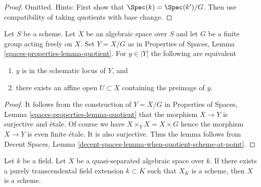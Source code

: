 \begin{proof}
Omitted. Hints: First show that $\Spec(k) = \Spec(k')/G$.
Then use compatibility of taking quotients with base change.
\end{proof}

\begin{lemma}
\label{lemma-when-quotient-scheme-at-point}
Let $S$ be a scheme. Let $X$ be an algebraic space over $S$ and
let $G$ be a finite group acting freely on $X$. Set $Y = X/G$ as
in Properties of Spaces, Lemma \ref{spaces-properties-lemma-quotient}.
For $y \in |Y|$ the following are equivalent
\begin{enumerate}
\item $y$ is in the schematic locus of $Y$, and
\item there exists an affine open $U \subset X$
containing the preimage of $y$.
\end{enumerate}
\end{lemma}

\begin{proof}
It follows from the construction of $Y = X/G$ in
Properties of Spaces, Lemma \ref{spaces-properties-lemma-quotient}
that the morphism $X \to Y$ is surjective and \'etale.
Of course we have $X \times_Y X = X \times G$ hence the morphism
$X \to Y$ is even finite \'etale. It is also surjective.
Thus the lemma follows from
Decent Spaces, Lemma \ref{decent-spaces-lemma-when-quotient-scheme-at-point}.
\end{proof}

\begin{lemma}
\label{lemma-scheme-after-purely-transcendental-base-change}
Let $k$ be a field. Let $X$ be a quasi-separated
algebraic space over $k$. If there exists a purely transcendental
field extension $k \subset K$ such that $X_K$ is a scheme, then
$X$ is a scheme.
\end{lemma}

